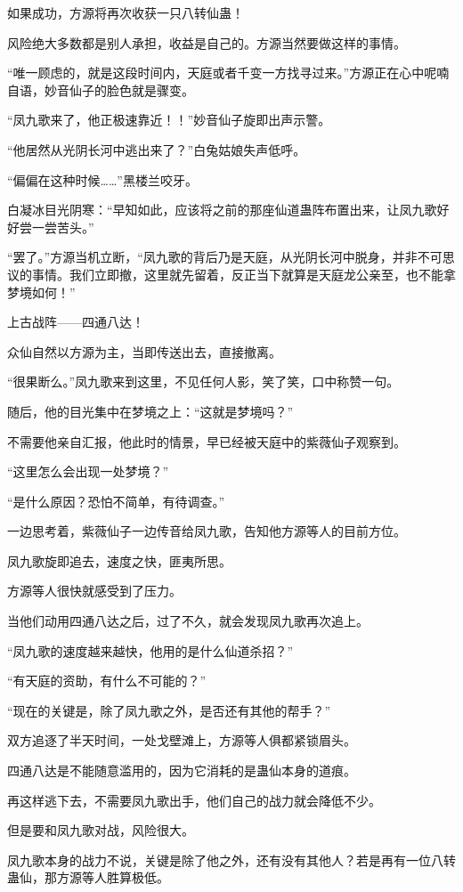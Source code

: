 \begin{this_body}
如果成功，方源将再次收获一只八转仙蛊！

风险绝大多数都是别人承担，收益是自己的。方源当然要做这样的事情。

“唯一顾虑的，就是这段时间内，天庭或者千变一方找寻过来。”方源正在心中呢喃自语，妙音仙子的脸色就是骤变。

“凤九歌来了，他正极速靠近！！”妙音仙子旋即出声示警。

“他居然从光阴长河中逃出来了？”白兔姑娘失声低呼。

“偏偏在这种时候……”黑楼兰咬牙。

白凝冰目光阴寒：“早知如此，应该将之前的那座仙道蛊阵布置出来，让凤九歌好好尝一尝苦头。”

“罢了。”方源当机立断，“凤九歌的背后乃是天庭，从光阴长河中脱身，并非不可思议的事情。我们立即撤，这里就先留着，反正当下就算是天庭龙公亲至，也不能拿梦境如何！”

上古战阵——四通八达！

众仙自然以方源为主，当即传送出去，直接撤离。

“很果断么。”凤九歌来到这里，不见任何人影，笑了笑，口中称赞一句。

随后，他的目光集中在梦境之上：“这就是梦境吗？”

不需要他亲自汇报，他此时的情景，早已经被天庭中的紫薇仙子观察到。

“这里怎么会出现一处梦境？”

“是什么原因？恐怕不简单，有待调查。”

一边思考着，紫薇仙子一边传音给凤九歌，告知他方源等人的目前方位。

凤九歌旋即追去，速度之快，匪夷所思。

方源等人很快就感受到了压力。

当他们动用四通八达之后，过了不久，就会发现凤九歌再次追上。

“凤九歌的速度越来越快，他用的是什么仙道杀招？”

“有天庭的资助，有什么不可能的？”

“现在的关键是，除了凤九歌之外，是否还有其他的帮手？”

双方追逐了半天时间，一处戈壁滩上，方源等人俱都紧锁眉头。

四通八达是不能随意滥用的，因为它消耗的是蛊仙本身的道痕。

再这样逃下去，不需要凤九歌出手，他们自己的战力就会降低不少。

但是要和凤九歌对战，风险很大。

凤九歌本身的战力不说，关键是除了他之外，还有没有其他人？若是再有一位八转蛊仙，那方源等人胜算极低。


\end{this_body}
